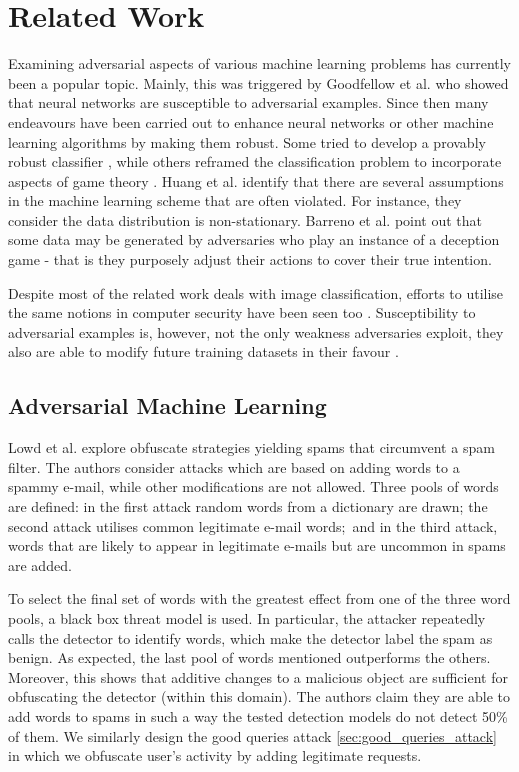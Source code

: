 \section{Related Work}\label{sec:related_work}

Examining adversarial aspects of various machine learning problems has
currently been a popular topic. Mainly, this was triggered by Goodfellow et al.
\cite{adversarial_examples} who showed that neural networks are susceptible to
adversarial examples. Since then many endeavours have been carried out
to enhance neural networks or other machine learning algorithms by making them robust. Some tried to develop
a provably robust classifier \cite{provable_defenses}, while others reframed the
classification problem to incorporate aspects of game theory
\cite{stackelberg_games}. Huang et al. \cite{huang} identify that there are several assumptions in the machine learning scheme that are often violated. For instance, they consider the data distribution is non-stationary. Barreno et al. \cite{barreno} point out that some data may be generated by adversaries who play an instance of a deception game - that is they purposely adjust their actions to cover their true intention.

Despite most of the related work deals with image
classification, efforts to utilise the same notions in computer security
have been seen too \cite{adversarial_malware_pe, adversarial_malware_binary, adversarial_malware}. Susceptibility to adversarial
examples is, however, not the only weakness adversaries exploit, they
also are able to modify future training datasets in their favour
\cite{antidote}.


\subsection{Adversarial Machine Learning}

Lowd et al. \cite{good_word_attacks} explore obfuscate strategies yielding spams that
circumvent a spam filter. The authors consider attacks which are based
on adding words to a spammy e-mail, while other modifications are not
allowed. Three pools of words are defined: in the first attack
random words from a dictionary are drawn; the second attack utilises
common legitimate e-mail words;~and in the third attack, words that
are likely to appear in legitimate e-mails but are uncommon in spams are
added.

To select the final set of words with the greatest effect from one of
the three word pools, a black box threat model is used. In particular,
the attacker repeatedly calls the detector to identify words, which make
the detector label the spam as benign. As expected, the last pool of
words mentioned outperforms the others. Moreover, this shows that
additive changes to a malicious object are sufficient for obfuscating
the detector (within this domain). The authors claim they are able to
add words to spams in such a way the tested detection models do not
detect 50\% of them. We similarly design the good queries attack \ref{sec:good_queries_attack} in which we obfuscate user's activity by adding legitimate requests.

